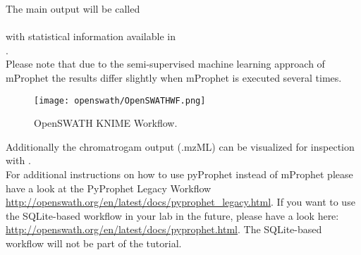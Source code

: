 \begin{comment}
\noindent If you have a valid python installation, pyProphet can be used. Further instructions the installation of python can be found in the pyOpenMS section. 

\noindent Installation of the current stable version:
\begin{listing}
\begin{verbatim}
pip install pyprophet
\end{verbatim}
\end{listing}

\noindent The following command should provide similar results to the mProphet script:
\begin{listing}
\begin{verbatim}
pyprophet score --in OpenSWATH_quant.tsv --out OpenSWATH_quant_scoring.tsv --group_id transition_group_id --pi0_lambda 1e-6 1e-2 1e-6
\end{verbatim}
\end{listing}
\end{comment}

\noindent The main output will be called\\
\\
with statistical information available in\\
.\\

\noindent Please note that due to the semi-supervised machine learning approach of mProphet the results differ slightly when mProphet is executed several times. \\

\begin{figure}[!ht]
  \texttt{[image: openswath/OpenSWATHWF.png]}
  \caption{OpenSWATH KNIME Workflow.}
  \label{fig:openswath}
\end{figure}

\noindent Additionally the chromatrogam output (.mzML) can be visualized for inspection with . \\

\noindent For additional instructions on how to use pyProphet instead of mProphet please have a look at the PyProphet Legacy Workflow \url{http://openswath.org/en/latest/docs/pyprophet_legacy.html}. If you want to use the SQLite-based workflow in your lab in the future, please have a look here: \url{http://openswath.org/en/latest/docs/pyprophet.html}. The SQLite-based workflow will not be part of the tutorial. \\


